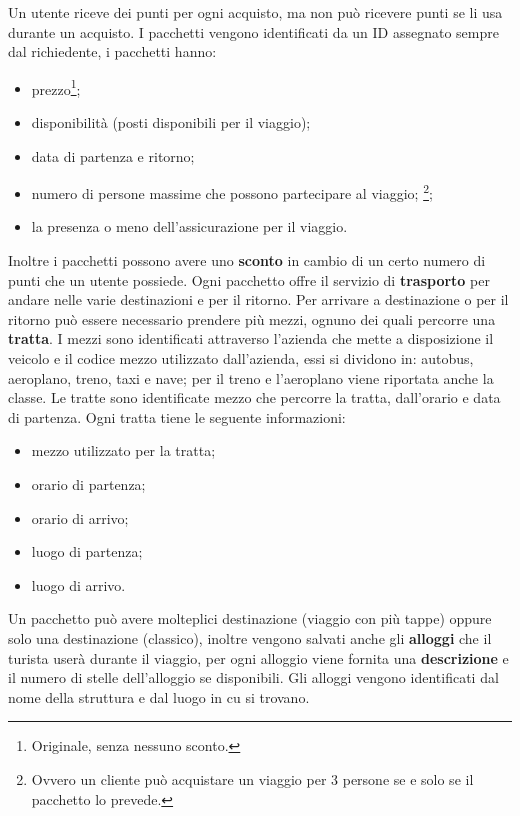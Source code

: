  Un utente riceve dei punti per ogni acquisto, ma non può ricevere punti se li usa durante un acquisto.
%
%
I pacchetti vengono identificati da un ID assegnato sempre dal richiedente, i pacchetti hanno:
\begin{multicols}{2}
    \begin{itemize}
        \item prezzo\footnote{Originale, senza nessuno sconto.};
        \item disponibilità (posti disponibili per il viaggio);
        \item data di partenza e ritorno;
        \item numero di persone massime che possono partecipare al viaggio;%
        \footnote{Ovvero un cliente può acquistare un viaggio per 3 persone se e solo se il pacchetto lo prevede.};
        \item la presenza o meno dell'assicurazione per il viaggio.
    \end{itemize}
 \end{multicols}
Inoltre i pacchetti possono avere uno \textbf{sconto} in cambio di un certo numero di punti che un utente possiede.
%
%
Ogni pacchetto offre il servizio di \textbf{trasporto} per andare nelle varie destinazioni e per il ritorno. Per arrivare a destinazione o per il ritorno può essere necessario prendere più mezzi, ognuno dei quali percorre una \textbf{tratta}. I mezzi sono identificati attraverso l'azienda che mette a disposizione il veicolo e il codice mezzo utilizzato dall'azienda, essi si dividono in: autobus, aeroplano, treno, taxi e nave; per il treno e l'aeroplano viene riportata anche la classe. Le tratte sono identificate mezzo che percorre la tratta, dall'orario e data di partenza. Ogni tratta tiene le seguente informazioni:
\begin{multicols}{2}
    \begin{itemize}
        \item mezzo utilizzato per la tratta;
        \item orario di partenza;
        \item orario di arrivo;
        \item luogo di partenza;
        \item luogo di arrivo.
    \end{itemize}
\end{multicols}
%
%
Un pacchetto può avere molteplici destinazione (viaggio con più tappe) oppure solo una destinazione (classico), inoltre vengono salvati anche gli \textbf{alloggi} che il turista userà durante il viaggio, per ogni alloggio viene fornita una \textbf{descrizione} e il numero di stelle dell'alloggio se disponibili. Gli alloggi vengono identificati dal nome della struttura e dal luogo in cu si trovano.
